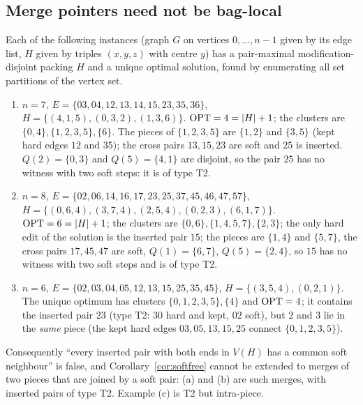 \subsection{Merge pointers need not be bag-local}
\begin{proposition}\label{prop:cex}
Each of the following instances (graph $G$ on vertices $0,\dots,n-1$ given by its edge list, $H$ given by triples $(x,y,z)$ with centre $y$) has a pair-maximal modification-disjoint packing $H$ and a unique optimal solution, found by enumerating all set partitions of the vertex set.
\begin{enumerate}
\item[(a)] $n=7$, $E=\{03,\allowbreak 04,\allowbreak 12,\allowbreak 13,\allowbreak 14,\allowbreak 15,\allowbreak 23,\allowbreak 35,\allowbreak 36\}$, $H=\{(4,1,5),\allowbreak(0,3,2),\allowbreak(1,3,6)\}$. $\mathrm{OPT}=4=|H|+1$; the clusters are $\{0,4\},\{1,2,3,5\},\{6\}$. The pieces of $\{1,2,3,5\}$ are $\{1,2\}$ and $\{3,5\}$ (kept hard edges $12$ and $35$); the cross pairs $13,15,23$ are soft and $25$ is inserted. $Q(2)=\{0,3\}$ and $Q(5)=\{4,1\}$ are disjoint, so the pair $25$ has no witness with two soft steps: it is of type T2.
\item[(b)] $n=8$, $E=\{02,\allowbreak 06,\allowbreak 14,\allowbreak 16,\allowbreak 17,\allowbreak 23,\allowbreak 25,\allowbreak 37,\allowbreak 45,\allowbreak 46,\allowbreak 47,\allowbreak 57\}$, $H=\{(0,6,4),\allowbreak(3,7,4),\allowbreak(2,5,4),\allowbreak(0,2,3),\allowbreak(6,1,7)\}$. $\mathrm{OPT}=6=|H|+1$; the clusters are $\{0,6\},\{1,4,5,7\},\{2,3\}$; the only hard edit of the solution is the inserted pair $15$; the pieces are $\{1,4\}$ and $\{5,7\}$, the cross pairs $17,45,47$ are soft, $Q(1)=\{6,7\}$, $Q(5)=\{2,4\}$, so $15$ has no witness with two soft steps and is of type T2.
\item[(c)] $n=6$, $E=\{02,\allowbreak 03,\allowbreak 04,\allowbreak 05,\allowbreak 12,\allowbreak 13,\allowbreak 15,\allowbreak 25,\allowbreak 35,\allowbreak 45\}$, $H=\{(3,5,4),\allowbreak(0,2,1)\}$. The unique optimum has clusters $\{0,1,2,3,5\},\{4\}$ and $\mathrm{OPT}=4$; it contains the inserted pair $23$ (type T2: $30$ hard and kept, $02$ soft), but $2$ and $3$ lie in the \emph{same} piece (the kept hard edges $03,05,13,15,25$ connect $\{0,1,2,3,5\}$).
\end{enumerate}
Consequently ``every inserted pair with both ends in $V(H)$ has a common soft neighbour'' is false, and Corollary~\ref{cor:softfree} cannot be extended to merges of two pieces that are joined by a soft pair: (a) and (b) are such merges, with inserted pairs of type T2. Example (c) is T2 but intra-piece.
\end{proposition}
